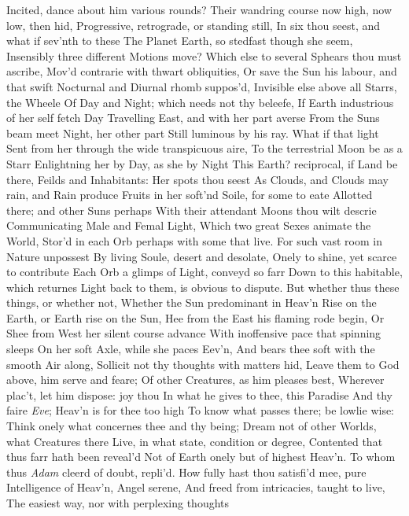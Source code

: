 \documentclass[11pt]{book}
\begin{document}
Incited, dance about him various rounds? 
Their wandring course now high, now low, then hid, 
Progressive, retrograde, or standing still, 
In six thou seest, and what if sev'nth to these 
The Planet Earth, so stedfast though she seem, 
Insensibly three different Motions move? 
Which else to several Sphears thou must ascribe, 
Mov'd contrarie with thwart obliquities, 
Or save the Sun his labour, and that swift 
Nocturnal and Diurnal rhomb suppos'd, 
Invisible else above all Starrs, the Wheele 
Of Day and Night; which needs not thy beleefe, 
If Earth industrious of her self fetch Day 
Travelling East, and with her part averse 
From the Suns beam meet Night, her other part 
Still luminous by his ray.  What if that light 
Sent from her through the wide transpicuous aire, 
To the terrestrial Moon be as a Starr 
Enlightning her by Day, as she by Night 
This Earth? reciprocal, if Land be there, 
Feilds and Inhabitants: Her spots thou seest 
As Clouds, and Clouds may rain, and Rain produce 
Fruits in her soft'nd Soile, for some to eate 
Allotted there; and other Suns perhaps 
With their attendant Moons thou wilt descrie 
Communicating Male and Femal Light, 
Which two great Sexes animate the World, 
Stor'd in each Orb perhaps with some that live. 
For such vast room in Nature unpossest 
By living Soule, desert and desolate, 
Onely to shine, yet scarce to contribute 
Each Orb a glimps of Light, conveyd so farr 
Down to this habitable, which returnes 
Light back to them, is obvious to dispute. 
But whether thus these things, or whether not, 
Whether the Sun predominant in Heav'n 
Rise on the Earth, or Earth rise on the Sun, 
Hee from the East his flaming rode begin, 
Or Shee from West her silent course advance 
With inoffensive pace that spinning sleeps 
On her soft Axle, while she paces Eev'n, 
And bears thee soft with the smooth Air along, 
Sollicit not thy thoughts with matters hid, 
Leave them to God above, him serve and feare; 
Of other Creatures, as him pleases best, 
Wherever plac't, let him dispose: joy thou 
In what he gives to thee, this Paradise 
And thy faire \textit{Eve}; Heav'n is for thee too high 
To know what passes there; be lowlie wise: 
Think onely what concernes thee and thy being; 
Dream not of other Worlds, what Creatures there 
Live, in what state, condition or degree, 
Contented that thus farr hath been reveal'd 
Not of Earth onely but of highest Heav'n. 
\quad To whom thus \textit{Adam} cleerd of doubt, repli'd. 
How fully hast thou satisfi'd mee, pure 
Intelligence of Heav'n, Angel serene, 
And freed from intricacies, taught to live, 
The easiest way, nor with perplexing thoughts 
\end{document}
